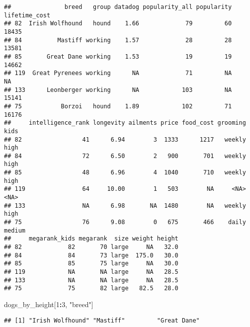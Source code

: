 \documentclass[
]{article}
\newenvironment{Shaded}{\begin{snugshade}}{\end{snugshade}}
\newcommand{\DecValTok}[1]{\textcolor[rgb]{0.00,0.00,0.81}{#1}}
\newcommand{\NormalTok}[1]{#1}
\newcommand{\OperatorTok}[1]{\textcolor[rgb]{0.81,0.36,0.00}{\textbf{#1}}}
\newcommand{\StringTok}[1]{\textcolor[rgb]{0.31,0.60,0.02}{#1}}
\begin{document}
\begin{verbatim}
##               breed   group datadog popularity_all popularity lifetime_cost
## 82  Irish Wolfhound   hound    1.66             79         60         18435
## 84          Mastiff working    1.57             28         28         13581
## 85       Great Dane working    1.53             19         19         14662
## 119  Great Pyrenees working      NA             71         NA            NA
## 133      Leonberger working      NA            103         NA         15141
## 75           Borzoi   hound    1.89            102         71         16176
##     intelligence_rank longevity ailments price food_cost grooming   kids
## 82                 41      6.94        3  1333      1217   weekly   high
## 84                 72      6.50        2   900       701   weekly   high
## 85                 48      6.96        4  1040       710   weekly   high
## 119                64     10.00        1   503        NA     <NA>   <NA>
## 133                NA      6.98       NA  1480        NA   weekly   high
## 75                 76      9.08        0   675       466    daily medium
##     megarank_kids megarank  size weight height
## 82             82       70 large     NA   32.0
## 84             84       73 large  175.0   30.0
## 85             85       75 large     NA   30.0
## 119            NA       NA large     NA   28.5
## 133            NA       NA large     NA   28.5
## 75             75       82 large   82.5   28.0
\end{verbatim}

\begin{Shaded}
\begin{Highlighting}[]
\NormalTok{dogs\_by\_height[}\DecValTok{1}\OperatorTok{:}\DecValTok{3}\NormalTok{, }\StringTok{"breed"}\NormalTok{]}
\end{Highlighting}
\end{Shaded}

\begin{verbatim}
## [1] "Irish Wolfhound" "Mastiff"         "Great Dane"
\end{verbatim}
\end{document}
